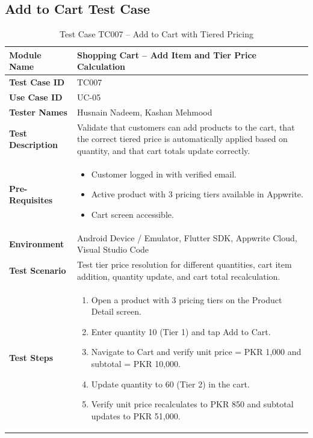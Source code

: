 \subsection{Add to Cart Test Case}

\begin{table}[H]
\centering
\caption{Test Case TC007 -- Add to Cart with Tiered Pricing}
\label{tab:tc007}
\renewcommand{\arraystretch}{1.15}
\small
\begin{tabular}{|p{3.2cm}|p{10.8cm}|}
\hline
\textbf{Module Name} & Shopping Cart -- Add Item and Tier Price Calculation \\ \hline
\textbf{Test Case ID} & TC007 \\ \hline
\textbf{Use Case ID} & UC-05 \\ \hline
\textbf{Tester Names} & Husnain Nadeem, Kashan Mehmood \\ \hline
\textbf{Test Description} & Validate that customers can add products to the cart, that the correct tiered price is automatically applied based on quantity, and that cart totals update correctly. \\ \hline
\textbf{Pre-Requisites} &
\begin{itemize}[leftmargin=*,noitemsep]
\item Customer logged in with verified email.
\item Active product with 3 pricing tiers available in Appwrite.
\item Cart screen accessible.
\end{itemize} \\ \hline
\textbf{Environment} & Android Device / Emulator, Flutter SDK, Appwrite Cloud, Visual Studio Code \\ \hline
\textbf{Test Scenario} & Test tier price resolution for different quantities, cart item addition, quantity update, and cart total recalculation. \\ \hline
\textbf{Test Steps} &
\begin{enumerate}[leftmargin=*,noitemsep]
\item Open a product with 3 pricing tiers on the Product Detail screen.
\item Enter quantity 10 (Tier 1) and tap Add to Cart.
\item Navigate to Cart and verify unit price = PKR 1,000 and subtotal = PKR 10,000.
\item Update quantity to 60 (Tier 2) in the cart.
\item Verify unit price recalculates to PKR 850 and subtotal updates to PKR 51,000.

\end{enumerate}
\end{tabular}
\end{table}
